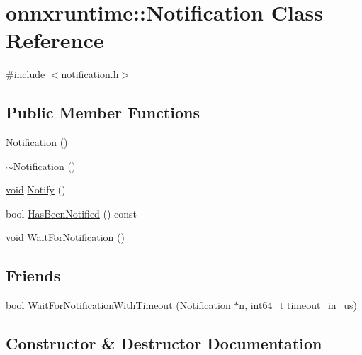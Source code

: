 \hypertarget{classonnxruntime_1_1Notification}{}\section{onnxruntime\+:\+:Notification Class Reference}
\label{classonnxruntime_1_1Notification}


{\ttfamily \#include $<$notification.\+h$>$}

\subsection*{Public Member Functions}
\begin{DoxyCompactItemize}
\item 
\mbox{\hyperlink{classonnxruntime_1_1Notification_a243730c2a94484b80285530ee899fde2}{Notification}} ()
\item 
\mbox{\hyperlink{classonnxruntime_1_1Notification_af43d6525d8bd5c8c751783f692dacded}{$\sim$\+Notification}} ()
\item 
\mbox{\hyperlink{mlasi_8h_a88f941d423cb2a819b70a1358982b1a6}{void}} \mbox{\hyperlink{classonnxruntime_1_1Notification_adca1502a0727e86bc8e3c5895baf0a98}{Notify}} ()
\item 
bool \mbox{\hyperlink{classonnxruntime_1_1Notification_a4a69fdd4536d563e373d29192d70b248}{Has\+Been\+Notified}} () const
\item 
\mbox{\hyperlink{mlasi_8h_a88f941d423cb2a819b70a1358982b1a6}{void}} \mbox{\hyperlink{classonnxruntime_1_1Notification_a1ca7a2bd2e81f5cc3fa905f350ed7ba5}{Wait\+For\+Notification}} ()
\end{DoxyCompactItemize}
\subsection*{Friends}
\begin{DoxyCompactItemize}
\item 
bool \mbox{\hyperlink{classonnxruntime_1_1Notification_a5a1bad8dd49ea3eaeac9755c7ef4928e}{Wait\+For\+Notification\+With\+Timeout}} (\mbox{\hyperlink{classonnxruntime_1_1Notification}{Notification}} $\ast$n, int64\+\_\+t timeout\+\_\+in\+\_\+us)
\end{DoxyCompactItemize}


\subsection{Constructor \& Destructor Documentation}
\mbox{\label{classonnxruntime_1_1Notification_a243730c2a94484b80285530ee899fde2}} 
